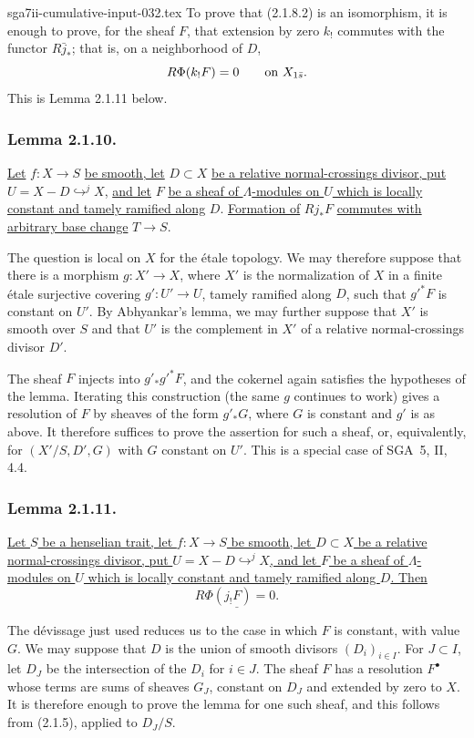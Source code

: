 \begin{filecontents*}{sga7ii-cumulative-input-032.tex}
To prove that (2.1.8.2) is an isomorphism, it is enough to prove, for
the sheaf $F$, that extension by zero $k_!$ commutes with the functor
$R\bar j_*$; that is, on a neighborhood of $D$,
\[
R\Phi(k_!F)=0\qquad\hbox{on }X_{1\bar s}.
\]
This is Lemma 2.1.11 below.

\subsubsection*{Lemma 2.1.10.}
\underline{Let} $f:X\longrightarrow S$ \underline{be smooth, let}
$D\subset X$ \underline{be a relative normal-crossings divisor, put}
$U=X-D\mathrel{\mathop{\hookrightarrow}^{j}}X$, \underline{and let}
$F$ \underline{be a sheaf of $\Lambda$-modules on $U$ which is locally
constant and tamely ramified along} $D$.  \underline{Formation of}
$Rj_*F$ \underline{commutes with arbitrary base change}
$T\longrightarrow S$.

The question is local on $X$ for the \'{e}tale topology.  We may
therefore suppose that there is a morphism $g:X'\longrightarrow X$,
where $X'$ is the normalization of $X$ in a finite \'{e}tale
surjective covering $g':U'\longrightarrow U$, tamely ramified along
$D$, such that $g'^*F$ is constant on $U'$.  By Abhyankar's lemma, we
may further suppose that $X'$ is smooth over $S$ and that $U'$ is the
complement in $X'$ of a relative normal-crossings divisor $D'$.

The sheaf $F$ injects into $g'_*g'^*F$, and the cokernel again
satisfies the hypotheses of the lemma.  Iterating this construction
(the same $g$ continues to work) gives a resolution of $F$ by sheaves
of the form $g'_*G$, where $G$ is constant and $g'$ is as above.  It
therefore suffices to prove the assertion for such a sheaf, or,
equivalently, for $(X'/S,D',G)$ with $G$ constant on $U'$.  This is a
special case of SGA~5, II, 4.4.

\subsubsection*{Lemma 2.1.11.}
\underline{Let $S$ be a henselian trait, let $f:X\longrightarrow S$
be smooth, let $D\subset X$ be a relative normal-crossings divisor,
put $U=X-D\mathrel{\mathop{\hookrightarrow}^{j}}X$, and let $F$ be a
sheaf of $\Lambda$-modules on $U$ which is locally constant and tamely
ramified along $D$.  Then}
\[
\underline{R\Phi(j_!F)=0.}
\]

The d\'{e}vissage just used reduces us to the case in which $F$ is
constant, with value $G$.  We may suppose that $D$ is the union of
smooth divisors $(D_i)_{i\in I}$.  For $J\subset I$, let $D_J$ be the
intersection of the $D_i$ for $i\in J$.  The sheaf $F$ has a
resolution $F^\bullet$ whose terms are sums of sheaves $G_J$, constant
on $D_J$ and extended by zero to $X$.  It is therefore enough to prove
the lemma for one such sheaf, and this follows from (2.1.5), applied to
$D_J/S$.


\end{filecontents*}
